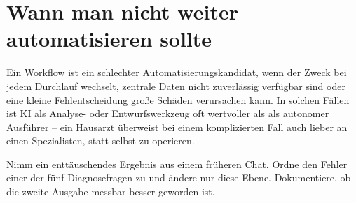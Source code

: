 \section{Wann man nicht weiter automatisieren sollte}

Ein Workflow ist ein schlechter Automatisierungskandidat, wenn der Zweck bei jedem Durchlauf wechselt, zentrale Daten nicht zuverlässig verfügbar sind oder eine kleine Fehlentscheidung große Schäden verursachen kann. In solchen Fällen ist KI als Analyse- oder Entwurfswerkzeug oft wertvoller als als autonomer Ausführer -- ein Hausarzt überweist bei einem komplizierten Fall auch lieber an einen Spezialisten, statt selbst zu operieren.

\begin{praxis}
Nimm ein enttäuschendes Ergebnis aus einem früheren Chat. Ordne den Fehler einer der fünf Diagnosefragen zu und ändere nur diese Ebene. Dokumentiere, ob die zweite Ausgabe messbar besser geworden ist.
\end{praxis}
